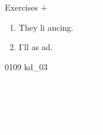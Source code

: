 \documentclass[aspectratio=169,xcolor={dvipsnames,table}]{beamer}
\begin{document}
\begin{frame}[plain]{Exercises  $+$ }
  \Large
  \begin{enumerate}
    \item<2-> They li  ancing.
    \item<4-> I'll as  ad.
  \end{enumerate}


  \hfill{\tiny 0109}\,{\scriptsize {}\,kd\_03}

\end{frame}
\begin{frame}

  \hypertarget{today}{}
  \centering
  \textcolor{white}{\Huge\bfseries Today's Pronunciation}

  \vspace{30pt}

  \textcolor{white}{\Large 連続する破裂音}

  \textcolor{white}{\Large {} $+$ }
\end{frame}
\end{document}
